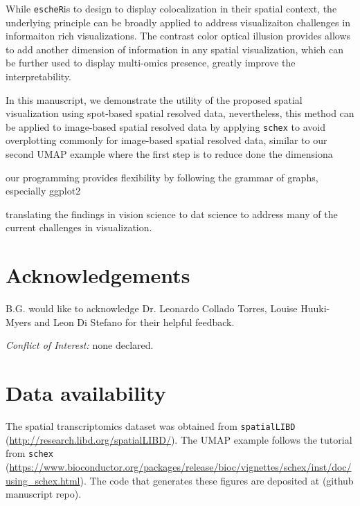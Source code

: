 \documentclass[11pt]{article}
\newcommand{\fixme}[1]{{\color{red} (#1)}}
\newcommand{\coloc}{\texttt{escheR}}
\begin{document}
While \coloc is to design to display colocalization in their spatial context, the underlying principle can be broadly applied to address visualizaiton challenges in informaiton rich visualizations. The contrast color optical illusion provides allows to add another dimension of information in any spatial visualization, which can be further used to display multi-omics presence, greatly improve the interpretability. 

In this manuscript, we demonstrate the utility of the proposed spatial visualization using spot-based spatial resolved data, nevertheless, this method can be applied to image-based spatial resolved data by applying \texttt{schex} to avoid overplotting commonly for image-based spatial resolved data, similar to our second UMAP example where the first step is to reduce done the dimensiona

our programming provides flexibility by following the grammar of graphs, especially ggplot2


translating the findings in vision science to dat science to address many of the current challenges in visualization.


\section*{Acknowledgements}
B.G. would like to acknowledge Dr. Leonardo Collado Torres, Louise Huuki-Myers and Leon Di Stefano for their helpful feedback.

\vspace{0.2in}
\noindent \textit{Conflict of Interest:} none declared.

\section*{Data availability}
The spatial transcriptomics dataset was obtained from \texttt{spatialLIBD} (\url{http://research.libd.org/spatialLIBD/}). The UMAP example follows the tutorial from \texttt{schex} (\url{https://www.bioconductor.org/packages/release/bioc/vignettes/schex/inst/doc/using_schex.html}). The code that generates these figures are deposited at \fixme{github manuscript repo}.
\end{document}
